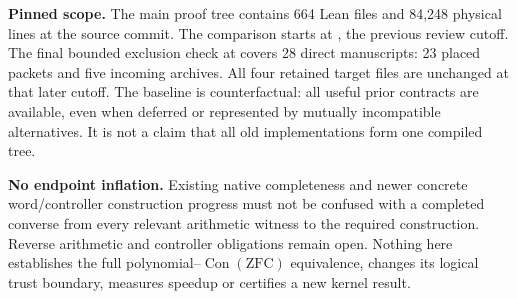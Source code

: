 \textbf{Pinned scope.} The main proof tree contains 664 Lean files and 84,248 physical lines at the source commit. The comparison starts at , the previous review cutoff. The final bounded exclusion check at  covers 28 direct manuscripts: 23 placed packets and five incoming archives. All four retained target files are unchanged at that later cutoff. The baseline is counterfactual: all useful prior contracts are available, even when deferred or represented by mutually incompatible alternatives. It is not a claim that all old implementations form one compiled tree.

\textbf{No endpoint inflation.} Existing native completeness and newer concrete word/controller construction progress must not be confused with a completed converse from every relevant arithmetic witness to the required construction. Reverse arithmetic and controller obligations remain open. Nothing here establishes the full polynomial--\(\operatorname{Con}(\mathrm{ZFC})\) equivalence, changes its logical trust boundary, measures speedup or certifies a new kernel result.
